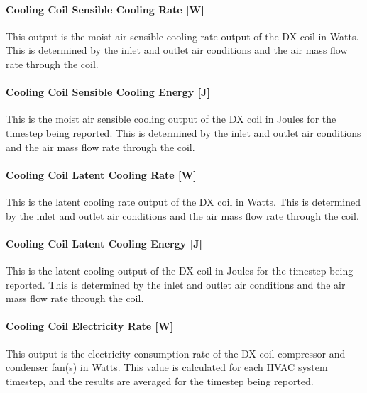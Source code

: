 \paragraph{Cooling Coil Sensible Cooling Rate {[}W{]}}\label{cooling-coil-sensible-cooling-rate-w-4}

This output is the moist air sensible cooling rate output of the DX coil in Watts. This is determined by the inlet and outlet air conditions and the air mass flow rate through the coil.

\paragraph{Cooling Coil Sensible Cooling Energy {[}J{]}}\label{cooling-coil-sensible-cooling-energy-j-4}

This is the moist air sensible cooling output of the DX coil in Joules for the timestep being reported. This is determined by the inlet and outlet air conditions and the air mass flow rate through the coil.

\paragraph{Cooling Coil Latent Cooling Rate {[}W{]}}\label{cooling-coil-latent-cooling-rate-w-2}

This is the latent cooling rate output of the DX coil in Watts. This is determined by the inlet and outlet air conditions and the air mass flow rate through the coil.

\paragraph{Cooling Coil Latent Cooling Energy {[}J{]}}\label{cooling-coil-latent-cooling-energy-j-2}

This is the latent cooling output of the DX coil in Joules for the timestep being reported. This is determined by the inlet and outlet air conditions and the air mass flow rate through the coil.

\paragraph{Cooling Coil Electricity Rate {[}W{]}}\label{cooling-coil-electric-power-w}

This output is the electricity consumption rate of the DX coil compressor and condenser fan(s) in Watts. This value is calculated for each HVAC system timestep, and the results are averaged for the timestep being reported.

